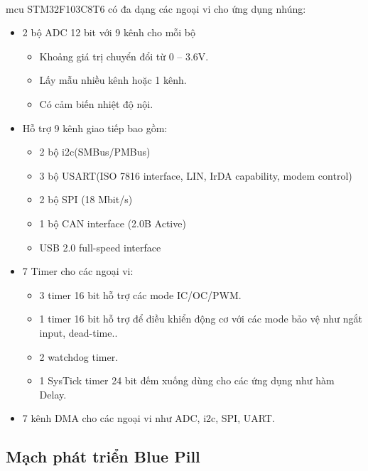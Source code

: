 \paragraph{}
\acrshort{mcu} STM32F103C8T6 có đa dạng các ngoại vi cho ứng dụng nhúng:
\begin{itemize}
    \item 2 bộ ADC 12 bit với 9 kênh cho mỗi bộ
    \begin{itemize}
        \item Khoảng giá trị chuyển đổi từ 0 – 3.6V.
        \item Lấy mẫu nhiều kênh hoặc 1 kênh.
        \item Có cảm biến nhiệt độ nội.
    \end{itemize}
    \item Hỗ trợ 9 kênh giao tiếp bao gồm:
    \begin{itemize}
        \item 2 bộ \acrshort{i2c}(SMBus/PMBus)
        \item 3 bộ USART(ISO 7816 interface, LIN, IrDA capability, modem control)
        \item 2 bộ SPI (18 Mbit/s)
        \item 1 bộ CAN interface (2.0B Active)
        \item USB 2.0 full-speed interface
    \end{itemize}
    \item 7 Timer cho các ngoại vi:
    \begin{itemize}
        \item 3 timer 16 bit hỗ trợ các mode IC/OC/PWM.
        \item 1 timer 16 bit hỗ trợ để điều khiển động cơ với các mode bảo vệ như ngắt input, dead-time..
        \item 2 watchdog timer.
        \item 1 SysTick timer 24 bit đếm xuống dùng cho các ứng dụng như hàm Delay.
    \end{itemize}
    \item 7 kênh DMA cho các ngoại vi như ADC, \acrshort{i2c}, SPI, UART.
\end{itemize}
\subsection{Mạch phát triển Blue Pill}
